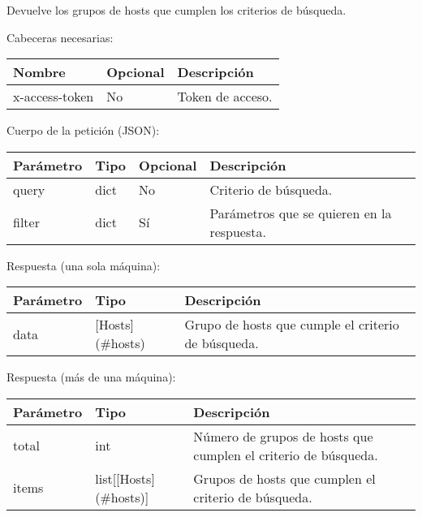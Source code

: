 Devuelve los grupos de hosts que cumplen los criterios de búsqueda.

Cabeceras necesarias:

\begin{table}[h!]
	\centering
	\begin{adjustbox}{max width=\textwidth}
	\begin{tabular}{|l|l|l|}
		\hline
		Nombre & Opcional & Descripción \\ \hline
		x-access-token & No & Token de acceso. \\ \hline
	\end{tabular}
\end{adjustbox}
\end{table}

Cuerpo de la petición (JSON):
\begin{table}[h!]
	\centering
	\begin{adjustbox}{max width=\textwidth}
	\begin{tabular}{|l|l|l|l|}
		\hline
		Parámetro & Tipo & Opcional & Descripción \\ \hline
		query & dict & No & Criterio de búsqueda. \\ \hline
		filter & dict & Sí & Parámetros que se quieren en la respuesta. \\ \hline
	\end{tabular}
\end{adjustbox}
\end{table}

Respuesta (una sola máquina):
\begin{table}[h!]
	\centering
	\begin{adjustbox}{max width=\textwidth}
	\begin{tabular}{|l|l|l|}
		\hline
		Parámetro & Tipo & Descripción \\ \hline
		data & [Hosts](\#hosts) & Grupo de hosts que cumple el criterio de búsqueda. \\ \hline
	\end{tabular}
\end{adjustbox}
\end{table}

Respuesta (más de una máquina):
\begin{table}[h!]
	\centering
	\begin{adjustbox}{max width=\textwidth}
	\begin{tabular}{|l|l|l|}
		\hline
		Parámetro & Tipo & Descripción \\ \hline
		total & int & Número de grupos de hosts que cumplen el criterio de búsqueda. \\ \hline
		items & list[[Hosts](\#hosts)] & Grupos de hosts que cumplen el criterio de búsqueda. \\ \hline
	\end{tabular}
\end{adjustbox}
\end{table}



